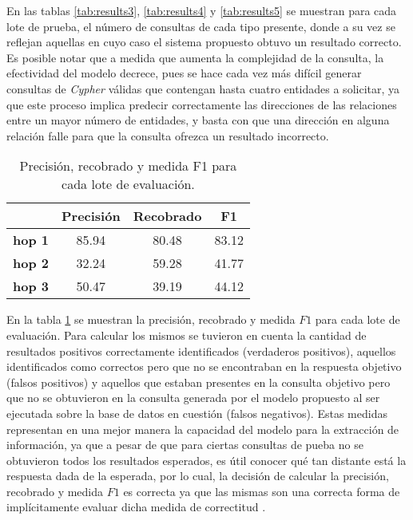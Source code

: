 En las tablas \ref{tab:results3}, \ref{tab:results4} y \ref{tab:results5} se muestran para cada lote de prueba, el número de consultas de cada tipo presente, donde a su vez se reflejan aquellas en cuyo caso el sistema propuesto obtuvo un resultado correcto. Es posible notar que a medida que aumenta la complejidad de la consulta, la efectividad del modelo decrece, pues se hace cada vez más difícil generar consultas de \textit{Cypher} válidas que contengan hasta cuatro entidades a solicitar, ya que este proceso implica predecir correctamente las direcciones de las relaciones entre un mayor número de entidades, y basta con que una dirección en alguna relación falle para que la consulta ofrezca un resultado incorrecto.

\begin{table}[H]
\centering
\begin{tabular}{|c|c|c|c|}
\hline
 & \textbf{Precisión} & \textbf{Recobrado} & \textbf{F1} \\ \hline
\textbf{hop 1} & 85.94 & 80.48  & 83.12 \\ \hline
\textbf{hop 2} & 32.24 & 59.28 & 41.77 \\ \hline
\textbf{hop 3} & 50.47 & 39.19 & 44.12 \\ \hline
\end{tabular}
\caption{Precisión, recobrado y medida F1 para cada lote de evaluación.}
\label{tab:results6}
\end{table}

En la tabla \ref{tab:results6} se muestran la precisión, recobrado y medida $F1$ para cada lote de evaluación. Para calcular los mismos se tuvieron en cuenta la cantidad de resultados positivos correctamente identificados (verdaderos positivos), aquellos identificados como correctos pero que no se encontraban en la respuesta objetivo (falsos positivos) y aquellos que estaban presentes en la consulta objetivo pero que no se obtuvieron en la consulta generada por el modelo propuesto al ser ejecutada sobre la base de datos en cuestión (falsos negativos). Estas medidas representan en una mejor manera la capacidad del modelo para la extracción de información, ya que a pesar de que para ciertas consultas de pueba no se obtuvieron todos los resultados esperados, es útil conocer qué tan distante está la respuesta dada de la esperada, por lo cual, la decisión de calcular la precisión, recobrado y medida $F1$ es correcta ya que las mismas son una correcta forma de implícitamente evaluar dicha medida de correctitud \cite{precisionrecallf1}.

